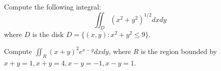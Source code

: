 \documentclass[openany]{book}
\begin{document}
\begin{prob}
    Compute the following integral:
    \begin{equation*}
        \iint_D(x^2+y^2)^{1/2}dxdy
    \end{equation*}
    where $D$ is the disk $D=\{(x,y):x^2+y^2\leq 9\}$.
\end{prob}

\begin{prob}
    Compute $\iint_R(x+y)^2e^{x-y}dxdy$, where $R$ is the region bounded by $x+y=1, x+y=4, x-y=-1, x-y=1$.
\end{prob}











\end{document}
